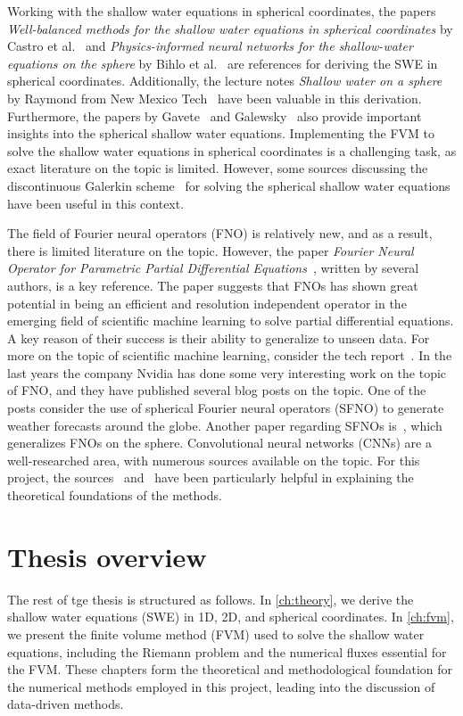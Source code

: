 Working with the shallow water equations in spherical coordinates, the papers \textit{Well-balanced methods for the shallow water equations in spherical coordinates} by Castro et al.~\cite{Castro2017} and \textit{Physics-informed neural networks for the shallow-water equations on the sphere} by Bihlo et al.~\cite{Bihlo2022} are references for deriving the SWE in spherical coordinates.
Additionally, the lecture notes \textit{Shallow water on a sphere} by Raymond from New Mexico Tech~\cite{Raymond} have been valuable in this derivation.
Furthermore, the papers by Gavete~\cite{Gavete_2009} and Galewsky~\cite{Galewsky_2004} also provide important insights into the spherical shallow water equations.
Implementing the FVM to solve the shallow water equations in spherical coordinates is a challenging task, as exact literature on the topic is limited.
However, some sources discussing the discontinuous Galerkin scheme~\cite{Hesthaven2008} for solving the spherical shallow water equations have been useful in this context.

The field of Fourier neural operators (FNO) is relatively new, and as a result, there is limited literature on the topic.
However, the paper \textit{Fourier Neural Operator for Parametric Partial Differential Equations}~\cite{FNO_2021}, written by several authors, is a key reference.
The paper suggests that FNOs has shown great potential in being an efficient and resolution independent operator in the emerging field of scientific machine learning to solve partial differential equations.
A key reason of their success is their ability to generalize to unseen data.
For more on the topic of scientific machine learning, consider the tech report~\cite{osti_1478744}.
In the last years the company Nvidia has done some very interesting work on the topic of FNO, and they have published several blog posts on the topic.
One of the posts consider the use of spherical Fourier neural operators (SFNO) to generate weather forecasts around the globe\cite{Nvidia2023}.
Another paper regarding SFNOs is~\cite{bonev2023-SFNO}, which generalizes FNOs on the sphere.
Convolutional neural networks (CNNs) are a well-researched area, with numerous sources available on the topic.
For this project, the sources~\cite{oshea2015introductionconvolutionalneuralnetworks} and~\cite{chollet2017comprehensive} have been particularly helpful in explaining the theoretical foundations of the methods.

\section{Thesis overview}
The rest of tge thesis is structured as follows.
In \autoref{ch:theory}, we derive the shallow water equations (SWE) in 1D, 2D, and spherical coordinates.
In \autoref{ch:fvm}, we present the finite volume method (FVM) used to solve the shallow water equations, including the Riemann problem and the numerical fluxes essential for the FVM.
These chapters form the theoretical and methodological foundation for the numerical methods employed in this project, leading into the discussion of data-driven methods.

